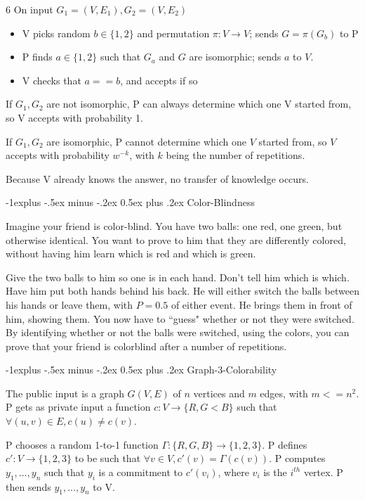 \documentclass[2pt,legalpaper]{scrartcl}
\makeatletter
\renewcommand{\subsection}{\@startsection{subsection}{2}{0mm}
  {-1explus -.5ex minus -.2ex}
  {0.5ex plus .2ex}
{\normalfont\normalsize\bfseries}}
\makeatother
\begin{document}
\begin{multicols}{6}
  On input $G_1 = (V, E_1), G_2 = (V, E_2)$ 
  \begin{itemize}
    \item V picks random $b \in \{1, 2\}$ and permutation $\pi: V \rightarrow V$; sends $G = \pi(G_b)$ to P
    \item P finds $a \in \{1, 2\}$ such that $G_a$ and $G$ are isomorphic; sends $a$ to $V$.
    \item V checks that $a == b$, and accepts if so
  \end{itemize}

  If $G_1, G_2$ are not isomorphic, P can always determine which one V started from, so V accepts with probability 1.

  If $G_1, G_2$ are isomorphic, P cannot determine which one $V$ started from, so $V$ accepts with probability $w^{-k}$, with $k$ being the number of repetitions.

  Because V already knows the answer, no transfer of knowledge occurs.

  \subsection{Color-Blindness}

  Imagine your friend is color-blind. You have two balls: one red, one green, but otherwise identical. You want to prove to him that they are differently colored, without having him learn which is red and which is green.

  Give the two balls to him so one is in each hand. Don't tell him which is which. Have him put both hands behind his back. He will either switch the balls between his hands or leave them, with $P = 0.5$ of either event. He brings them in front of him, showing them. You now have to ``guess" whether or not they were switched. By identifying whether or not the balls were switched, using the colors, you can prove that your friend is colorblind after a number of repetitions.

  \subsection{Graph-3-Colorability}

  The public input is a graph $G(V, E)$ of $n$ vertices and $m$ edges, with $m <= n^2$. P gets as private input a function $c: V \rightarrow \{R, G< B\}$ such that $\forall (u, v) \in E, c(u) \neq c(v)$.

  P chooses a random 1-to-1 function $\Gamma: \{R, G, B\} \rightarrow \{1, 2, 3\}$. P defines $c': V \rightarrow \{1, 2, 3\}$ to be such that $\forall v \in V, c'(v) = \Gamma(c(v))$. P computes $y_1, ..., y_n$ such that $y_i$ is a commitment to $c'(v_i)$, where $v_i$ is the $i^{th}$ vertex. P then sends $y_1, ..., y_n$ to V.


\end{multicols}
\end{document}
